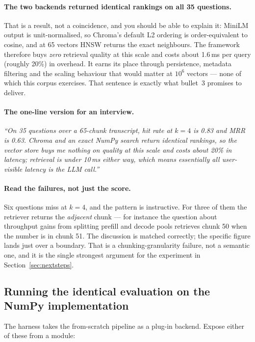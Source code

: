 \documentclass[11pt,a4paper]{article}
\begin{document}
\paragraph{The two backends returned identical rankings on all 35 questions.}
That is a result, not a coincidence, and you should be able to explain it:
MiniLM output is unit-normalised, so Chroma's default L2 ordering is
order-equivalent to cosine, and at 65 vectors HNSW returns the exact neighbours.
The framework therefore buys \emph{zero} retrieval quality at this scale and costs
about 1.6\,ms per query (roughly 20\%) in overhead. It earns its place through
persistence, metadata filtering and the scaling behaviour that would matter at
$10^6$ vectors --- none of which this corpus exercises. That sentence is
exactly what bullet~3 promises to deliver.

\paragraph{The one-line version for an interview.}
\emph{``On 35 questions over a 65-chunk transcript, hit rate at $k=4$ is 0.83 and
MRR is 0.63. Chroma and an exact NumPy search return identical rankings, so the
vector store buys me nothing on quality at this scale and costs about 20\% in
latency; retrieval is under 10\,ms either way, which means essentially all
user-visible latency is the LLM call.''}

\paragraph{Read the failures, not just the score.} Six questions miss at $k=4$,
and the pattern is instructive. For three of them the retriever returns the
\emph{adjacent} chunk --- for instance the question about throughput gains from
splitting prefill and decode pools retrieves chunk 50 when the number is in chunk
51. The discussion is matched correctly; the specific figure lands just over a
boundary. That is a chunking-granularity failure, not a semantic one, and it is
the single strongest argument for the experiment in
Section~\ref{sec:nextsteps}.

\subsection{Running the identical evaluation on the NumPy implementation}

The harness takes the from-scratch pipeline as a plug-in backend. Expose either
of these from a module:
\end{document}
